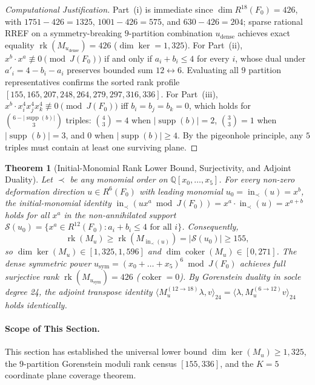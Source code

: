 \documentclass[11pt,a4paper]{amsart}
\newtheorem{theorem}{Theorem}[section]
\theoremstyle{definition}
\theoremstyle{remark}
\DeclareMathOperator{\rk}{rk}
\DeclareMathOperator{\coker}{coker}
\begin{document}
\begin{proof}[Computational Justification]
Part~(i) is immediate since $\dim R^{18}(F_0) = 426$, with $1751-426=1325$, $1001-426=575$, and $630-426=204$; sparse rational RREF on a symmetry-breaking $9$-partition combination $u_{\mathrm{dense}}$ achieves exact equality $\rk(M_{u_{\mathrm{dense}}}) = 426$ ($\dim \ker = 1,325$). For Part~(ii), $x^b \cdot x^a \not\equiv 0 \pmod{J(F_0)}$ if and only if $a_i + b_i \le 4$ for every $i$, whose dual under $a'_i = 4 - b_i - a_i$ preserves bounded sum $12 \leftrightarrow 6$. Evaluating all $9$ partition representatives confirms the sorted rank profile $[155, 165, 207, 248, 264, 279, 297, 316, 336]$. For Part~(iii), $x^b \cdot x_i^4 x_j^4 x_k^4 \not\equiv 0 \pmod{J(F_0)}$ iff $b_i=b_j=b_k=0$, which holds for $\binom{6 - |\operatorname{supp}(b)|}{3}$ triples: $\binom{4}{3}=4$ when $|\operatorname{supp}(b)|=2$, $\binom{3}{3}=1$ when $|\operatorname{supp}(b)|=3$, and $0$ when $|\operatorname{supp}(b)|\ge 4$. By the pigeonhole principle, any $5$ triples must contain at least one surviving plane.
\end{proof}

\begin{theorem}[Initial-Monomial Rank Lower Bound, Surjectivity, and Adjoint Duality]
\label{thm:initial_monomial_journal}
Let $\prec$ be any monomial order on $\mathbb{Q}[x_0, \dots, x_5]$. For every non-zero deformation direction $u \in R^6(F_0)$ with leading monomial $u_0 = \operatorname{in}_\prec(u) = x^b$, the initial-monomial identity $\operatorname{in}_\prec(u x^a \bmod J(F_0)) = x^a \cdot \operatorname{in}_\prec(u) = x^{a+b}$ holds for all $x^a$ in the non-annihilated support $\mathcal{S}(u_0) = \{x^a \in R^{12}(F_0) : a_i + b_i \le 4 \text{ for all } i\}$. Consequently,
\begin{equation}
\rk(M_u) \ge \rk(M_{\operatorname{in}_\prec(u)}) = |\mathcal{S}(u_0)| \ge 155,
\end{equation}
so $\dim \ker(M_u) \in [1,325, 1,596]$ and $\dim \coker(M_u) \in [0, 271]$. The dense symmetric power $u_{\mathrm{sym}} = (x_0 + \dots + x_5)^6 \bmod J(F_0)$ achieves full surjective rank $\rk(M_{u_{\mathrm{sym}}}) = 426$ ($\coker = 0$). By Gorenstein duality in socle degree 24, the adjoint transpose identity $\langle M_u^{(12 \to 18)} \lambda, v \rangle_{24} = \langle \lambda, M_u^{(6 \to 12)} v \rangle_{24}$ holds identically.
\end{theorem}

\paragraph{Scope of This Section.}
This section has established the universal lower bound $\dim\ker(M_u) \ge 1,325$, the $9$-partition Gorenstein moduli rank census $[155, 336]$, and the $K=5$ coordinate plane coverage theorem.
\end{document}

